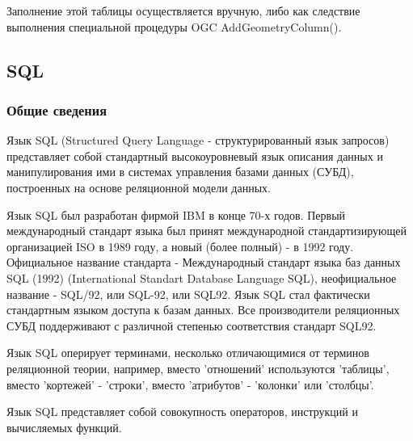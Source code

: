 \documentclass[12pt,a4paper,oneside]{article} %
\begin{document}
Заполнение этой таблицы осуществляется вручную, либо как следствие выполнения специальной процедуры OGC AddGeometryColumn().


\newpage
\subsection{SQL}
\subsubsection{Общие сведения}
Язык SQL (Structured Query Language - структурированный язык запросов) \linebreak
представляет собой стандартный высокоуровневый язык описания данных и \linebreak
манипулирования ими в системах управления базами данных (СУБД), \linebreak
построенных на основе реляционной модели данных.

Язык SQL был разработан фирмой IBM в конце 70-х годов. Первый \linebreak
международный стандарт языка был принят международной \linebreak
стандартизирующей организацией ISO в 1989 году, а новый \linebreak
(более полный) - в 1992 году. Официальное название стандарта - \linebreak
Международный стандарт языка баз данных SQL (1992) \linebreak
(International Standart Database Language SQL), неофициальное \linebreak
название - SQL/92, или SQL-92, или SQL92. Язык SQL стал \linebreak
фактически стандартным языком доступа к базам данных. Все \linebreak
производители реляционных СУБД поддерживают с различной степенью \linebreak
соответствия стандарт SQL92.

Язык SQL оперирует терминами, несколько отличающимися от терминов \linebreak
реляционной теории, например, вместо 'отношений' используются \linebreak
'таблицы', вместо 'кортежей' - 'строки', вместо 'атрибутов' - \linebreak
'колонки' или 'столбцы'.

Язык SQL представляет собой совокупность операторов, инструкций \linebreak
и вычисляемых функций.
\end{document}
